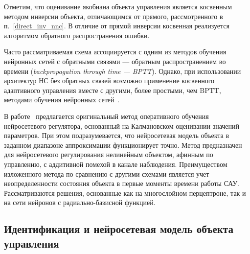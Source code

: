 Отметим, что оценивание якобиана объекта управления является косвенным
методом инверсии объекта, отличающимся от прямого, рассмотренного в
п.~\ref{direct_inv_nnc}.  В отличие от прямой инверсии косвенная
реализуется алгоритмом обратного распространения ошибки.


Часто рассматриваемая схема ассоциируется с одним из методов обучения
нейронных сетей с обратными связями --- обратным распространением во
времени ({\it backpropagation through time --- BPTT}).  Однако, при
использовании архитектур НС без обратных связей возможно применение
косвенного адаптивного управления вместе с другими, более простыми,
чем BPTT, методами обучения нейронных сетей~\cite{narpart92}.

В работе~\cite{fabri98} предлагается оригинальный метод оперативного
обучения нейросетевого регулятора, основанный на Калмановском
оценивании значений параметров.  При этом подразумевается, что
нейросетевая модель объекта в заданном диапазоне аппроксимации
функционирует точно.  Метод предназначен для нейросетевого
регулирования нелинейным объектом, афинным по управлению, с аддитивной
помехой в канале наблюдения.  Преимуществом изложенного метода по
сравнению с другими схемами является учет неопределенности состояния
объекта в первые моменты времени работы САУ.  Рассматриваются решения,
основанные как на многослойном перцептроне, так и на сети нейронов с
радиально-базисной функцией.



\subsection{Идентификация и нейросетевая модель объекта управления}%
\label{identif_and_nnp}

